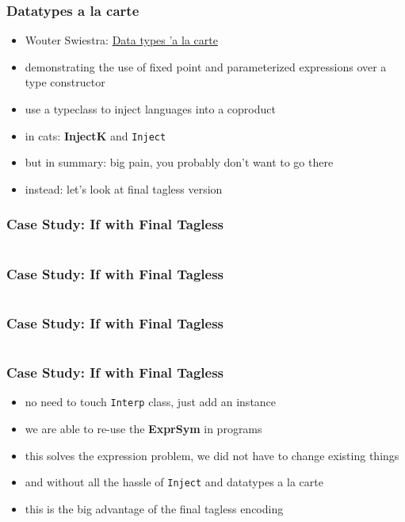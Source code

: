 \documentclass[aspectratio=169, hyperref={colorlinks, linkcolor=beamer@centricgreen}, urlcolor=links]{beamer}
\begin{document}
\begin{frame}
  \frametitle{Datatypes a la carte}
  \begin{itemize}
  \item Wouter Swiestra: \href{https://www.cs.ru.nl/~W.Swierstra/Publications/DataTypesALaCarte.pdf}{Data types 'a la carte}
  \item demonstrating the use of fixed point and parameterized expressions over a type constructor
  \item use a typeclass to inject languages into a coproduct
  \item in cats: \textbf{InjectK} and \texttt{Inject}
  \item but in summary: big pain, you probably don't want to go there
  \item instead: let's look at final tagless version
  \end{itemize}
\end{frame}

\begin{frame}[fragile]
  \frametitle{Case Study: If with Final Tagless}
  \inputminted[fontsize=\footnotesize]{scala}{snippets/final-tagless-expr-if.scala}
\end{frame}

\begin{frame}[fragile]
  \frametitle{Case Study: If with Final Tagless}
  \inputminted[fontsize=\footnotesize]{scala}{snippets/final-tagless-sample-if.scala}
\end{frame}

\begin{frame}[fragile]
  \frametitle{Case Study: If with Final Tagless}
  \inputminted[fontsize=\footnotesize]{scala}{snippets/final-tagless-interp-if.scala}
\end{frame}

\begin{frame}
  \frametitle{Case Study: If with Final Tagless}
  \begin{itemize}
  \item no need to touch \texttt{Interp} class, just add an instance
  \item we are able to re-use the \textbf{ExprSym} in programs
  \item this solves the expression problem, we did not have to change existing things
  \item and without all the hassle of \texttt{Inject} and datatypes a la carte
  \item this is the big advantage of the final tagless encoding
  \end{itemize}
\end{frame}
\end{document}
